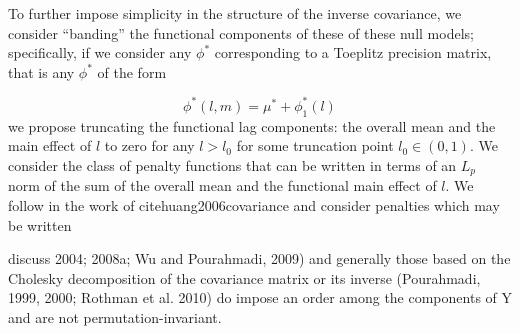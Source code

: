 \documentclass[12pt]{article}
\theoremstyle{definition}
\begin{document}







To further impose simplicity in the structure of the inverse covariance, we consider ``banding'' the functional components of these of these null models; specifically, if we consider any $\phi^*$ corresponding to a Toeplitz precision matrix, that is any $\phi^*$ of the form

\begin{equation}
\phi^*\left(l,m\right) = \mu^* + \phi^*_1\left(l\right)
\end{equation}
\noindent
we propose truncating the functional lag components:  the overall mean and the main effect of $l$ to zero for any $l > l_0$ for some truncation point $l_0 \in \left(0,1\right)$. We consider the class of penalty functions that can be written in terms of an $L_p$ norm of the sum of the overall mean and the functional main effect of $l$. We follow in the work of cite{huang2006covariance} and consider penalties which may be written



\citet{bickel2008regularized} discuss 
2004; 2008a; Wu and Pourahmadi, 2009) and generally those based on the Cholesky decomposition
of the covariance matrix or its inverse (Pourahmadi, 1999, 2000; Rothman et al.
2010) do impose an order among the components of Y and are not permutation-invariant.
\end{document}

